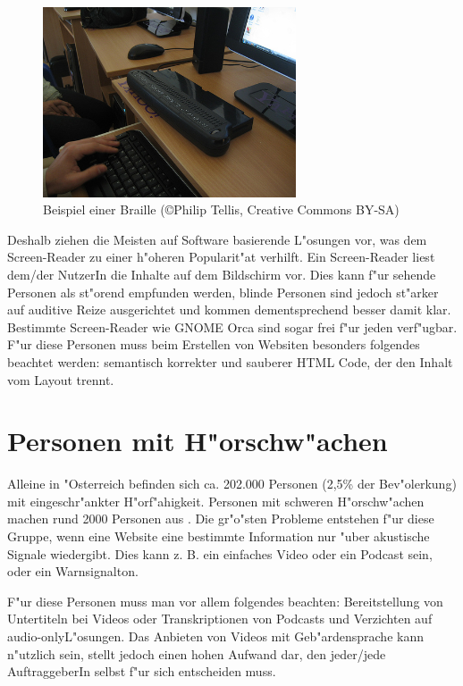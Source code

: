 \documentclass[a4paper,bibtotoc,oneside]{scrbook}
\begin{document}
\begin{figure}[braille]
\centering
\includegraphics[width=75mm]{braille}
\caption[Beispiel einer Braille]{Beispiel einer Braille (\copyright  Philip Tellis, Creative Commons BY-SA)}\label{Abb1}
\end{figure}

Deshalb ziehen die Meisten auf Software basierende L"osungen vor, was dem Screen-Reader zu einer h"oheren Popularit"at verhilft\cite[S. 249-250]{screen_read_frust}. Ein Screen-Reader liest dem/der NutzerIn die Inhalte auf dem Bildschirm vor. Dies kann f"ur sehende Personen als st"orend empfunden werden, blinde Personen sind jedoch st"arker auf auditive Reize ausgerichtet und kommen dementsprechend besser damit klar\cite[S. 13]{barr_webd}. Bestimmte Screen-Reader wie GNOME Orca \cite{orca} sind sogar frei f"ur jeden verf"ugbar. 
F"ur diese Personen muss beim Erstellen von Websiten besonders folgendes beachtet werden: semantisch korrekter und sauberer HTML Code, der den Inhalt vom Layout trennt.\cite[S. 13-15]{barr_webd}

\section{Personen mit H"orschw"achen}
Alleine in "Osterreich befinden sich ca. 202.000 Personen (2,5\% der Bev"olerkung) mit eingeschr"ankter H"orf"ahigkeit. Personen mit schweren H"orschw"achen machen rund 2000 Personen aus \cite[S. 13-14]{stat_austria}. Die gr"o"sten Probleme entstehen f"ur diese Gruppe, wenn eine Website eine bestimmte Information nur "uber akustische Signale wiedergibt. Dies kann z. B. ein einfaches Video oder ein Podcast sein, oder ein Warnsignalton. \cite[S. 17]{barr_webd}\cite[S. 20]{understand_acc}

F"ur diese Personen muss man vor allem folgendes beachten: Bereitstellung von Untertiteln bei Videos oder Transkriptionen von Podcasts und Verzichten auf \glqq audio-only\grqq L"osungen. Das Anbieten von Videos mit Geb"ardensprache kann n"utzlich sein, stellt jedoch einen hohen Aufwand dar, den jeder/jede AuftraggeberIn selbst f"ur sich entscheiden muss. \cite[S. 17]{barr_webd}\cite[S. 20]{understand_acc}
\end{document}
